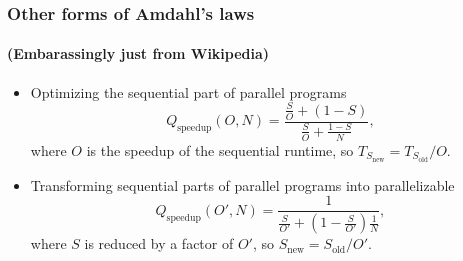 \begin{frame}
\frametitle{Other forms of Amdahl's laws}
\framesubtitle{(Embarassingly just from Wikipedia)}
\begin{itemize}
	\item Optimizing the sequential part of parallel programs
	\begin{equation}
		Q_{\text{speedup}} \left( O, N \right)
		=
		\frac{\frac{S}{O} + \left( 1 - S \right)}{\frac{S}{O} + \frac{1 - S}{N}},
	\end{equation}
	where $O$ is the speedup of the sequential runtime, so $T_{S_{\text{new}}} = T_{S_{\text{old}}} / O$.
	\item Transforming sequential parts of parallel programs into parallelizable
	\begin{equation}
		Q_{\text{speedup}} \left( O', N \right)
		=
		\frac{1}{\frac{S}{O'} + \left( 1 - \frac{S}{O'} \right) \frac{1}{N}},
	\end{equation}
	where $S$ is reduced by a factor of $O'$, so $S_{\text{new}} = S_{\text{old}} / O'$.
\end{itemize}

\end{frame}